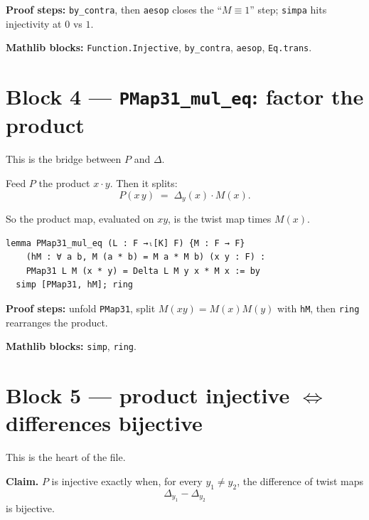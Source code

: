 \documentclass[11pt]{article}
\begin{document}
\textbf{Proof steps:} \texttt{by\_contra}, then \texttt{aesop} closes the
``$M\equiv 1$'' step; \texttt{simpa} hits injectivity at $0$ vs $1$.

\textbf{Mathlib blocks:} \texttt{Function.Injective},
\texttt{by\_contra}, \texttt{aesop}, \texttt{Eq.trans}.

\section{Block 4 --- \texttt{PMap31\_mul\_eq}: factor the product}

This is the bridge between $P$ and $\Delta$.

Feed $P$ the product $x\cdot y$.  Then it splits:
\[
  P(x\,y) \;=\; \Delta_y(x)\cdot M(x).
\]

So the product map, evaluated on $xy$, is the twist map times $M(x)$.

\begin{center}
\end{center}

\begin{lstlisting}
lemma PMap31_mul_eq (L : F →ₗ[K] F) {M : F → F}
    (hM : ∀ a b, M (a * b) = M a * M b) (x y : F) :
    PMap31 L M (x * y) = Delta L M y x * M x := by
  simp [PMap31, hM]; ring
\end{lstlisting}

\textbf{Proof steps:} unfold \texttt{PMap31}, split $M(xy)=M(x)M(y)$ with
\texttt{hM}, then \texttt{ring} rearranges the product.

\textbf{Mathlib blocks:} \texttt{simp}, \texttt{ring}.

\section{Block 5 --- product injective $\Leftrightarrow$ differences bijective}

This is the heart of the file.

\textbf{Claim.} $P$ is injective exactly when, for every $y_1\neq y_2$, the
difference of twist maps
\[
  \Delta_{y_1} - \Delta_{y_2}
\]
is bijective.

\begin{center}
\end{center}
\end{document}
